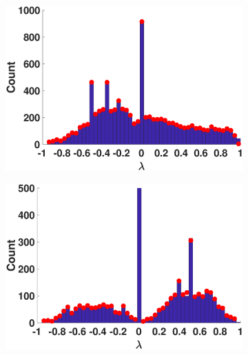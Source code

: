 \begin{figure}[ht]
\begin{subfigure}[t]{0.19\textwidth}
    \includegraphics[width=\textwidth,trim = .4cm 0.5cm 3.5cm 1.3cm,clip]
    {./ndos/pics/hepth}
    \label{fig:hepth_dos}
  \end{subfigure}
  \begin{subfigure}[t]{0.19\textwidth}
    \centering  
    \captionsetup{justification=centering,font=scriptsize}
    \includegraphics[width=\textwidth,trim = .4cm 0.5cm 3.5cm 1.3cm,clip]
    {./ndos/pics/as20000102}
    \label{fig:as2_dos}
  \end{subfigure}
  \begin{subfigure}[t]{0.19\textwidth}
    \centering
    \captionsetup{justification=centering,font=scriptsize}

\end{subfigure}
\end{figure}
